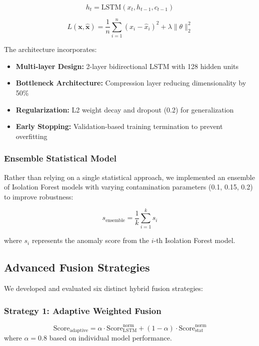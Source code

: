 \documentclass[conference]{IEEEtran}
\begin{document}
\begin{equation}
h_t = \text{LSTM}(x_t, h_{t-1}, c_{t-1})
\label{eq:lstm_hidden}
\end{equation}

\begin{equation}
L(\mathbf{x}, \mathbf{\hat{x}}) = \frac{1}{n} \sum_{i=1}^{n} (x_i - \hat{x}_i)^2 + \lambda \|\theta\|_2^2
\label{eq:mse_regularized}
\end{equation}

The architecture incorporates:
\begin{itemize}
    \item \textbf{Multi-layer Design:} 2-layer bidirectional LSTM with 128 hidden units
    \item \textbf{Bottleneck Architecture:} Compression layer reducing dimensionality by 50\%
    \item \textbf{Regularization:} L2 weight decay and dropout (0.2) for generalization
    \item \textbf{Early Stopping:} Validation-based training termination to prevent overfitting
\end{itemize}

\subsubsection{Ensemble Statistical Model}
Rather than relying on a single statistical approach, we implemented an ensemble of Isolation Forest models with varying contamination parameters (0.1, 0.15, 0.2) to improve robustness:

\begin{equation}
s_{\text{ensemble}} = \frac{1}{k} \sum_{i=1}^{k} s_i
\label{eq:ensemble_score}
\end{equation}

where $s_i$ represents the anomaly score from the $i$-th Isolation Forest model.

\subsection{Advanced Fusion Strategies}
We developed and evaluated six distinct hybrid fusion strategies:

\subsubsection{Strategy 1: Adaptive Weighted Fusion}
\begin{equation}
\text{Score}_{\text{adaptive}} = \alpha \cdot \text{Score}_{\text{LSTM}}^{\text{norm}} + (1-\alpha) \cdot \text{Score}_{\text{stat}}^{\text{norm}}
\label{eq:adaptive}
\end{equation}
where $\alpha = 0.8$ based on individual model performance.
\end{document}
